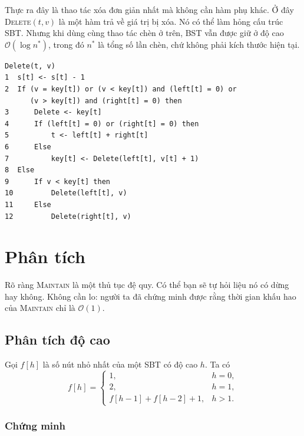 \documentclass[11pt]{article}
\newcommand{\Oh}{\mathcal{O}}
\begin{document}
Thực ra đây là thao tác xóa đơn giản nhất mà không cần hàm phụ khác. Ở đây
\textsc{Delete}$(t,v)$ là một hàm trả về giá trị bị xóa. Nó có thể làm hỏng
cấu trúc SBT. Nhưng khi dùng cùng thao tác chèn ở trên, BST vẫn được giữ ở độ
cao $\Oh(\log n^*)$, trong đó $n^*$ là tổng số lần chèn, chứ không phải kích
thước hiện tại.

\begin{verbatim}
Delete(t, v)
1  s[t] <- s[t] - 1
2  If (v = key[t]) or (v < key[t]) and (left[t] = 0) or
      (v > key[t]) and (right[t] = 0) then
3      Delete <- key[t]
4      If (left[t] = 0) or (right[t] = 0) then
5          t <- left[t] + right[t]
6      Else
7          key[t] <- Delete(left[t], v[t] + 1)
8  Else
9      If v < key[t] then
10         Delete(left[t], v)
11     Else
12         Delete(right[t], v)
\end{verbatim}

\section{Phân tích}

Rõ ràng \textsc{Maintain} là một thủ tục đệ quy. Có thể bạn sẽ tự hỏi liệu
nó có dừng hay không. Không cần lo: người ta đã chứng minh được rằng thời gian
khấu hao của \textsc{Maintain} chỉ là $\Oh(1)$.

\subsection{Phân tích độ cao}

Gọi $f[h]$ là số nút nhỏ nhất của một SBT có độ cao $h$. Ta có
\[
f[h]=
\begin{cases}
1, & h=0,\\
2, & h=1,\\
f[h-1]+f[h-2]+1, & h>1.
\end{cases}
\]

\subsubsection{Chứng minh}
\end{document}
